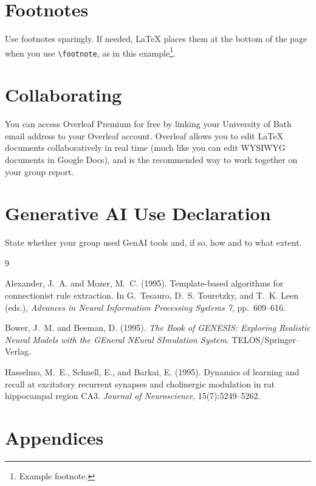 \documentclass[letterpaper]{article}
\begin{document}
\section{Footnotes}

Use footnotes sparingly. If needed, LaTeX places them at the bottom of the page when you use \verb|\footnote|, as in this example\footnote{Example footnote.}.

\section{Collaborating}

You can access Overleaf Premium for free by linking your University of Bath email address to your Overleaf account. Overleaf allows you to edit LaTeX documents collaboratively in real time (much like you can edit WYSIWYG documents in Google Docs), and is the recommended way to work together on your group report.

\clearpage
\section*{Generative AI Use Declaration}

State whether your group used GenAI tools and, if so, how and to what extent.

\small
\begin{thebibliography}{9}

Alexander, J.~A. and Mozer, M.~C. (1995).
Template-based algorithms for connectionist rule extraction.
In G.~Tesauro, D.~S. Touretzky, and T.~K. Leen (eds.),
\textit{Advances in Neural Information Processing Systems 7}, pp.~609--616.

Bower, J.~M. and Beeman, D. (1995).
\textit{The Book of GENESIS: Exploring Realistic Neural Models with the GEneral NEural SImulation System}.
TELOS/Springer--Verlag.

Hasselmo, M.~E., Schnell, E., and Barkai, E. (1995).
Dynamics of learning and recall at excitatory recurrent synapses and cholinergic modulation in rat hippocampal region CA3.
\textit{Journal of Neuroscience}, 15(7):5249--5262.

\end{thebibliography}
\normalsize

\clearpage
\section*{Appendices}
\end{document}
